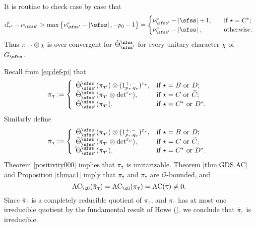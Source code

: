 \documentclass[12pt,a4paper]{amsart}
\def\abs#1{\left|{#1}\right|}
\newcommand{\CO}{{\mathcal {O}}}
\numberwithin{equation}{section}
\theoremstyle{remark}
\def\Thetab{\bar{\Theta}}
\begin{document}
It is routine to check case by case  that
\[
\mathrm d'_{\tau'}-\nu_{\sfss'}>\max \left \{\nu^\circ_{\sfss'}-\abs{\sfss}, -p_0-1\right \}=
  \begin{cases}
\nu^\circ_{\sfss'}-\abs{\sfss} +1,\quad& \textrm{if $\star =C^*$};\\
 \nu^\circ_{\sfss'}-\abs{\sfss},\quad& \textrm{otherwise}.
   \end{cases}
\]
Thus $\pi_{\uptau'}\otimes \chi$ is over-convergent for $\check \Theta_{\sfss'}^{\sfss}$ for every unitary character $\chi$ of $G_\sfss$.



Recall from \eqref{eq:def-pi} that
\[
    \pi_{\uptau}:=\left\{
     \begin{array}{ll}
         \check \Theta_{\sfss'}^{\sfss}(\pi_{\uptau'})\otimes (1_{p_\tau, q_\tau}^{+,-})^{\varepsilon_{\tau}}, &\hbox{if  $\star=B$ or $D$}; \\
         \check \Theta_{\sfss'}^{\sfss}(\pi_{\uptau'}\otimes \det^{\varepsilon_{\wp}}), &\hbox{if $\star=C$ or $\widetilde C$}; \\
              \check \Theta_{\sfss'}^{\sfss}(\pi_{\uptau'}), &\hbox{if $\star=C^*$ or $D^*$}. \\
            \end{array}
   \right.
\]
Similarly define
\[
   \bar \pi_{\uptau}:=\left\{
     \begin{array}{ll}
         \Thetab_{\sfss'}^{\sfss}(\pi_{\uptau'})\otimes (1_{p_\tau, q_\tau}^{+,-})^{\varepsilon_{\tau}}, &\hbox{if  $\star=B$ or $D$}; \\
          \Thetab_{\sfss'}^{\sfss}(\pi_{\uptau'}\otimes \det^{\varepsilon_{\wp}}), &\hbox{if $\star=C$ or $\widetilde C$}; \\
              \check \Thetab_{\sfss'}^{\sfss}(\pi_{\uptau'}), &\hbox{if $\star=C^*$ or $D^*$}. \\
            \end{array}
   \right.
\]
Theorem \ref{positivity000} implies that
$\bar \pi_{\uptau}$ is unitarizable.  Theorem \ref{thm:GDS.AC} and Proposition \ref{thmac1} imply that $\bar \pi_{\uptau}$ and $\pi_{\uptau}$ are $\CO$-bounded, and
\[
    \mathrm{AC}_{\cO}( \bar \pi_{\uptau})=\mathrm{AC}_{\cO}(\pi_{\uptau})=\mathrm{AC}(\uptau)\neq 0.
\]
Since $\bar \pi_{\uptau}$ is a completely reducible quotient of $\pi_{\uptau}$, and $\pi_{\uptau}$ has at most one  irreducible quotient by the fundamental result of Howe (\cite[Theorem 1A]{Howe89}), we conclude that $\bar \pi_{\uptau}$ is irreducible.
\end{document}
